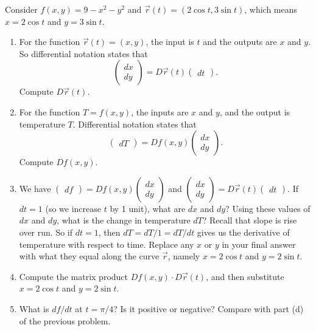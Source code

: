 \begin{problem}
 Consider $f(x,y)=9-x^2-y^2$ and $\vec r(t)=(2\cos t, 3\sin t)$, which means $x=2\cos t$ and $y=3\sin t$.
\begin{enumerate}
 \item{}%
For the function $\vec r(t)=(x,y)$, the input is $t$ and the outputs are $x$ and $y$.  So differential notation  states that 
$$\begin{pmatrix}dx\\dy\end{pmatrix}=D\vec r(t)\begin{pmatrix}dt\end{pmatrix}.$$
 Compute $D\vec r(t)$.
 \item For the function $T=f(x,y)$, the inputs are $x$ and $y$, and the output is temperature $T$. Differential notation  states that 
$$\begin{pmatrix}dT\end{pmatrix}=Df(x,y)\begin{pmatrix}dx\\dy\end{pmatrix}.$$
 Compute $Df(x,y)$.
 \item We have $\begin{pmatrix}df\end{pmatrix}=Df(x,y)\begin{pmatrix}dx\\dy\end{pmatrix}$ and $\begin{pmatrix}dx\\dy\end{pmatrix}=D\vec r(t)\begin{pmatrix}dt\end{pmatrix}.$ If $dt=1$ (so we increase $t$ by 1 unit), what are $dx$ and $dy$? Using these values of $dx$ and $dy$, what is the change in temperature $dT$? 
Recall that slope is rise over run.  So if $dt=1$, then $dT=dT/1=dT/dt$ gives us the derivative of temperature with respect to time. Replace any $x$ or $y$ in your final answer with what they equal along the curve $\vec r$, namely $x=2\cos t$ and $y=2\sin t$.
 \item Compute the matrix product $Df(x,y)\cdot D\vec r(t)$, and then substitute $x=2\cos t$ and $y=2\sin t$.
 \item What is $df/dt$ at $t=\pi/4$? Is it positive or negative? Compare with part (d) of the previous problem.
\end{enumerate}
\end{problem}

